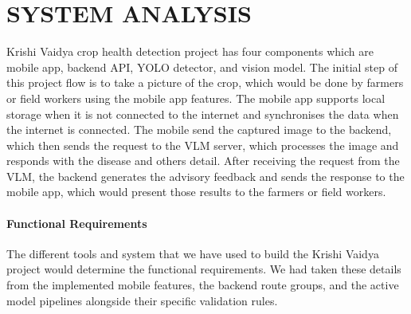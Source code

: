 
\chapter{SYSTEM ANALYSIS}



Krishi Vaidya crop health detection project has four components which are mobile app, backend API, YOLO detector, and vision model. The initial step of this project flow is to take a picture of the crop, which would be done by farmers or field workers using the mobile app features. The mobile app supports local storage when it is not connected to the internet and synchronises the data when the internet is connected. The mobile send the captured image to the backend, which then sends the request to the VLM server, which processes the image and responds with the disease and others detail. After receiving the request from the VLM, the backend generates the advisory feedback and sends the response to the mobile app, which would present those results to the farmers or field workers. 


\subsubsection{Functional Requirements}

The different tools and system that we have used to build the Krishi Vaidya project would determine the functional requirements. We had taken these details from the implemented mobile features, the backend route groups, and the active model pipelines alongside their specific validation rules.

